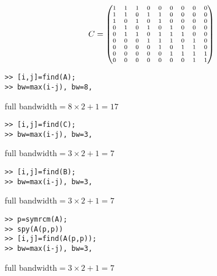 \begin{enumerate}
\begin{minipage}[t]{0.5\linewidth}
    \end{minipage}
    \begin{minipage}[t]{0.45\linewidth}
        
    \end{minipage}
    \begin{minipage}[t]{0.5\linewidth}
        \begin{align*}
            \scriptsize
            C = \begin{pmatrix}
                1 & 1 & 1 & 0 & 0 & 0 & 0 & 0 & 0\\
                1 & 1 & 0 & 1 & 1 & 0 & 0 & 0 & 0\\
                1 & 0 & 1 & 0 & 1 & 0 & 0 & 0 & 0\\
                0 & 1 & 0 & 1 & 0 & 1 & 0 & 0 & 0\\
                0 & 1 & 1 & 0 & 1 & 1 & 1 & 0 & 0\\
                0 & 0 & 0 & 1 & 1 & 1 & 0 & 1 & 0\\
                0 & 0 & 0 & 0 & 1 & 0 & 1 & 1 & 0\\
                0 & 0 & 0 & 0 & 0 & 1 & 1 & 1 & 1\\
                0 & 0 & 0 & 0 & 0 & 0 & 0 & 1 & 1
            \end{pmatrix}
        \end{align*}
    \end{minipage}
    \begin{minipage}[t]{0.45\linewidth}
        
    \end{minipage}
    \begin{minipage}[t]{0.45\linewidth}
        \begin{lstlisting}
>> [i,j]=find(A);
>> bw=max(i-j), bw=8,
        \end{lstlisting}
        full bandwidth$= 8 \times 2 + 1 = 17$
        \begin{lstlisting}
>> [i,j]=find(C);
>> bw=max(i-j), bw=3,
        \end{lstlisting}
        full bandwidth$= 3 \times 2 + 1 = 7$
    \end{minipage}\quad
    \begin{minipage}[t]{0.45\linewidth}
        \begin{lstlisting}
>> [i,j]=find(B);
>> bw=max(i-j), bw=3,
        \end{lstlisting}
        full bandwidth$= 3 \times 2 + 1 = 7$
        \begin{lstlisting}
>> p=symrcm(A);
>> spy(A(p,p))
>> [i,j]=find(A(p,p));
>> bw=max(i-j), bw=3,
        \end{lstlisting}
        full bandwidth$= 3 \times 2 + 1 = 7$
    \end{minipage}


\end{enumerate}
